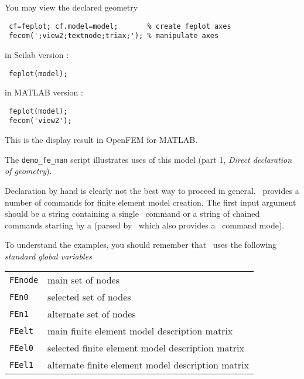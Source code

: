 You may view the declared geometry 

\begin{SDT}
\begin{verbatim}
 cf=feplot; cf.model=model;       % create feplot axes
 fecom(';view2;textnode;triax;'); % manipulate axes 
\end{verbatim}
\end{SDT}

\begin{OPENFEM}
in Scilab version :
\begin{verbatim}
 feplot(model);
\end{verbatim}
in MATLAB version :
\begin{verbatim}
 feplot(model);
 fecom('view2');
\end{verbatim}
\end{OPENFEM}

\begin{center}
\begin{figure}[H]
\centering
{}
\end{figure}

This is the display result in OpenFEM for MATLAB.
\end{center}

The {\tt demo\_fe\_man} script illustrates uses of this model (part 1, {\sl Direct declaration of geometry}).

\newpage

Declaration by hand is clearly not the best way to proceed in general.
\femesh\ provides a number of commands for finite element model creation. The first input argument should be a string containing a single \femesh\ command or a string of chained commands starting by a \ts{;} (parsed by \commode\ which also provides a \femesh\ command mode).


To understand the examples, you should remember that \femesh\ uses the following {\sl standard global variables}

\lvs\begin{tabular}{@{}p{}@{}p{}@{}}
%
{\tt FEnode} &  main set of nodes\\
{\tt FEn0}   &  selected set of nodes\\
{\tt FEn1}   &  alternate set of nodes\\
{\tt FEelt}  &  main finite element model description matrix\\
{\tt FEel0}  &  selected finite element model description matrix\\
{\tt FEel1}  &  alternate finite element model description matrix\\
%
\end{tabular}\lvs   

